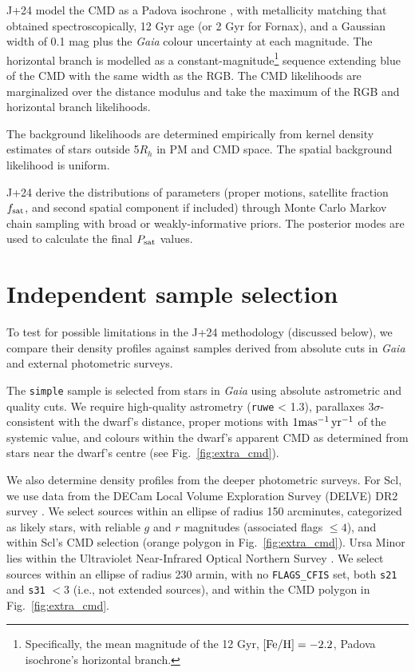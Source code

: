 J+24 model the CMD as a Padova isochrone \citep{girardi+2002}, with
metallicity matching that obtained spectroscopically, 12 Gyr age (or 2
Gyr for Fornax), and a Gaussian width of 0.1 mag plus the \emph{Gaia}
colour uncertainty at each magnitude. The horizontal branch is modelled
as a constant-magnitude\footnote{Specifically, the mean magnitude of the
  12 Gyr, \({\rm [Fe/H]}=-2.2\), Padova isochrone's horizontal branch.}
sequence extending blue of the CMD with the same width as the RGB. The
CMD likelihoods are marginalized over the distance modulus and take the
maximum of the RGB and horizontal branch likelihoods.

The background likelihoods are determined empirically from kernel
density estimates of stars outside 5\(R_h\) in PM and CMD space. The
spatial background likelihood is uniform.

J+24 derive the distributions of parameters (proper motions, satellite
fraction \(f_{\rm sat}\), and second spatial component if included)
through Monte Carlo Markov chain sampling with broad or
weakly-informative priors. The posterior modes are used to calculate the
final \(P_{\rm sat}\) values.

\section{Independent sample
selection}\label{independent-sample-selection}

To test for possible limitations in the J+24 methodology (discussed
below), we compare their density profiles against samples derived from
absolute cuts in \emph{Gaia} and external photometric surveys.

The \texttt{simple} sample is selected from stars in \emph{Gaia} using
absolute astrometric and quality cuts. We require high-quality
astrometry (\texttt{ruwe} \textless{} 1.3), parallaxes
\(3\sigma\)-consistent with the dwarf's distance, proper motions with
\(1{\rm mas^{-1}\,yr^{-1}}\) of the systemic value, and colours within the dwarf's
apparent CMD as determined from stars near the dwarf's centre (see
Fig.~\ref{fig:extra_cmd}).

We also determine density profiles from the deeper photometric surveys.
For Scl, we use data from the DECam Local Volume Exploration Survey
(DELVE) DR2 survey \citep{drlica-wagner+2022}. We select sources within
an ellipse of radius 150 arcminutes, categorized as likely stars, with
reliable \(g\) and \(r\) magnitudes (associated flags \(\leq 4\)), and
within Scl's CMD selection (orange polygon in Fig.~\ref{fig:extra_cmd}).
Ursa Minor lies within the Ultraviolet Near-Infrared Optical Northern
Survey \citep[UNIONS,][]{gwyn+2025}. We select sources within an ellipse
of radius 230 armin, with no \texttt{FLAGS\_CFIS} set, both \texttt{s21}
and \texttt{s31} \(<3\) (i.e., not extended sources), and within the CMD
polygon in Fig.~\ref{fig:extra_cmd}.

